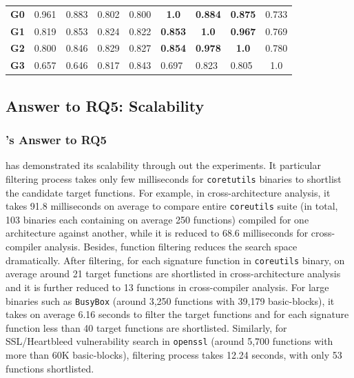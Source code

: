 \begin{table}[t]
\begin{tabular}{@{}lllllllll@{}}
\multicolumn{1}{l|}{\textbf{G0}} & \multicolumn{1}{l|}{0.961} & \multicolumn{1}{l|}{0.883} & \multicolumn{1}{l|}{0.802} & \multicolumn{1}{l|}{0.800} & \multicolumn{1}{c|}{\textbf{1.0}} & \multicolumn{1}{l|}{\textbf{0.884}} & \multicolumn{1}{l|}{\textbf{0.875}} & \multicolumn{1}{l|}{0.733} \\ \cmidrule(l){2-9}
\multicolumn{1}{l|}{\textbf{G1}} & \multicolumn{1}{l|}{0.819} & \multicolumn{1}{l|}{0.853} & \multicolumn{1}{l|}{0.824} & \multicolumn{1}{l|}{0.822} & \multicolumn{1}{l|}{\textbf{0.853}} & \multicolumn{1}{c|}{\textbf{1.0}} & \multicolumn{1}{l|}{\textbf{0.967}} & \multicolumn{1}{l|}{0.769} \\ \cmidrule(l){2-9}
\multicolumn{1}{l|}{\textbf{G2}} & \multicolumn{1}{l|}{0.800} & \multicolumn{1}{l|}{0.846} & \multicolumn{1}{l|}{0.829} & \multicolumn{1}{l|}{0.827} & \multicolumn{1}{l|}{\textbf{0.854}} & \multicolumn{1}{l|}{\textbf{0.978}} & \multicolumn{1}{c|}{\textbf{1.0}} & \multicolumn{1}{l|}{0.780} \\ \cmidrule(l){2-9}
\multicolumn{1}{l|}{\textbf{G3}} & \multicolumn{1}{l|}{0.657} & \multicolumn{1}{l|}{0.646} & \multicolumn{1}{l|}{0.817} & \multicolumn{1}{l|}{0.843} & \multicolumn{1}{l|}{0.697} & \multicolumn{1}{l|}{0.823} & \multicolumn{1}{l|}{0.805} & \multicolumn{1}{c|}{1.0} \\ \cmidrule(l){2-9}
\end{tabular}
\end{table}



\subsection{Answer to RQ5: Scalability}

\subsubsection{\tool's Answer to RQ5}

\tool has demonstrated its scalability through out the experiments. It particular filtering process takes only few milliseconds for \texttt{coretutils} binaries to shortlist the candidate target functions. For example, in cross-architecture analysis, it takes 91.8 milliseconds on average to compare entire \texttt{coreutils} suite (in total, 103 binaries each containing on average 250 functions) compiled for one architecture against another, while it is reduced to 68.6 milliseconds for cross-compiler analysis. Besides, function filtering reduces the search space dramatically. After filtering, for each signature function in \texttt{coreutils} binary, on average around 21 target functions are shortlisted in cross-architecture analysis and it is further reduced to 13 functions in cross-compiler analysis. For large binaries such as \texttt{BusyBox} (around 3,250 functions with 39,179 basic-blocks), it takes on average 6.16 seconds to filter the target functions and for each signature function less than 40 target functions are shortlisted. Similarly, for SSL/Heartbleed vulnerability search in \texttt{openssl} (around 5,700 functions with more than 60K basic-blocks), filtering process takes 12.24 seconds, with only 53 functions shortlisted.

